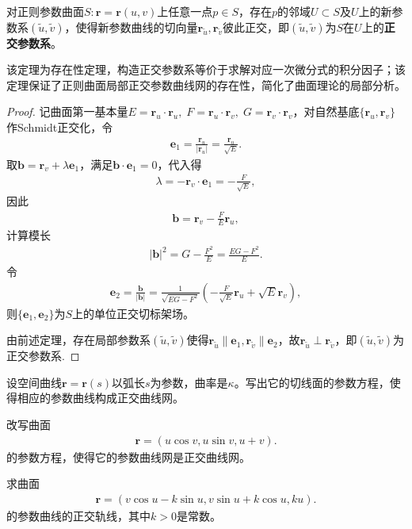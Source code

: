 \documentclass[../../main.tex]{subfiles}%
\begin{document}
\begin{theorem}
对正则参数曲面$S:\bm r=\bm r(u,v)$上任意一点$p\in S$，存在$p$的邻域$U\subset S$及$U$上的新参数系$(\tilde u,\tilde v)$，使得新参数曲线的切向量$\bm r_{\tilde u},\bm r_{\tilde v}$彼此正交，即$(\tilde u,\tilde v)$为$S$在$U$上的\textbf{正交参数系}。
\end{theorem}

\begin{remark}
该定理为存在性定理，构造正交参数系等价于求解对应一次微分式的积分因子；该定理保证了正则曲面局部正交参数曲线网的存在性，简化了曲面理论的局部分析。
\end{remark}

\begin{proof}
记曲面第一基本量$E=\bm r_u\cdot\bm r_u,\;F=\bm r_u\cdot\bm r_v,\;G=\bm r_v\cdot\bm r_v$，对自然基底$\{\bm r_u,\bm r_v\}$作Schmidt正交化，令
\begin{align}
\bm e_1=\frac{\bm r_u}{|\bm r_u|}=\frac{\bm r_u}{\sqrt{E}}.
\label{eq:orthobase1}
\end{align}
取$\bm b=\bm r_v+\lambda\bm e_1$，满足$\bm b\cdot\bm e_1=0$，代入得
\begin{align*}
\lambda = -\bm r_v\cdot\bm e_1 = -\frac{F}{\sqrt{E}},
\end{align*}
因此
\begin{align*}
\bm b=\bm r_v-\frac{F}{E}\bm r_u,
\end{align*}
计算模长
\begin{align*}
|\bm b|^2=G-\frac{F^2}{E}=\frac{EG-F^2}{E}.
\end{align*}
令
\begin{align}
\bm e_2=\frac{\bm b}{|\bm b|}=\frac{1}{\sqrt{EG-F^2}}\left(-\frac{F}{\sqrt{E}}\bm r_u+\sqrt{E}\bm r_v\right),
\label{eq:orthobase2}
\end{align}
则$\{\bm e_1,\bm e_2\}$为$S$上的单位正交切标架场。

由前述定理，存在局部参数系$(\tilde u,\tilde v)$使得$\bm r_{\tilde u}\parallel\bm e_1,\bm r_{\tilde v}\parallel\bm e_2$，故$\bm r_{\tilde u}\perp\bm r_{\tilde v}$，即$(\tilde u,\tilde v)$为正交参数系.
\end{proof}

\begin{example}
设空间曲线$\bm{r}=\bm{r}(s)$以弧长$s$为参数，曲率是$\kappa$。写出它的切线面的参数方程，使得相应的参数曲线构成正交曲线网。
\end{example}

\begin{example}
改写曲面
\begin{align*}
\bm{r}=(u\cos v,u\sin v,u+v).
\end{align*}
的参数方程，使得它的参数曲线网是正交曲线网。
\end{example}

\begin{example}
求曲面
\begin{align*}
\bm{r}=(v\cos u - k\sin u,v\sin u + k\cos u,ku).
\end{align*}
的参数曲线的正交轨线，其中$k>0$是常数。
\end{example}
\end{document}
